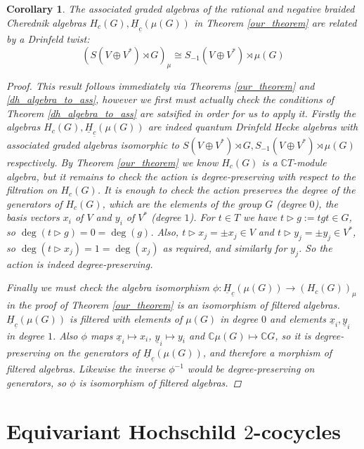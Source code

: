 \documentclass[10pt]{article}
\newcommand{\bb}{\medbreak}
\newcommand{\nt}{\noindent}
\newcommand{\Cc }{\mathbb{C}}
\newcommand{\rt}{\xrightarrow{}}
\newtheorem{cor}[lemma]{Corollary}
\theoremstyle{definition}
\begin{document}
\begin{cor} The associated graded algebras of the rational and negative braided Cherednik algebras $H_c(G),\underline{H}_{\underline{c}}(\mu(G))$ in Theorem \ref{our_theorem} are related by a Drinfeld twist:
\begin{equation}\label{twist_ass}(S(V\oplus V^*)\rtimes G)_\mu\cong S_{-1}(V\oplus V^*)\rtimes \mu(G)\end{equation}
\begin{proof}
This result follows immediately via Theorems \ref{our_theorem} and \ref{dh_algebra_to_ass}, however we first must actually check the conditions of Theorem  \ref{dh_algebra_to_ass} are satsified in order for us to apply it. Firstly the algebras $H_c(G),\underline{H}_{\underline{c}}(\mu(G))$ are indeed quantum Drinfeld Hecke algebras with associated graded algebras isomorphic to $S(V\oplus V^*)\rtimes G, S_{-1}(V\oplus V^*)\rtimes \mu(G)$ respectively. By Theorem \ref{our_theorem} we know $H_c(G)$ is a $\Cc  T$-module algebra, but it remains to check the action is degree-preserving with respect to the filtration on $H_c(G)$. It is enough to check the action preserves the degree of the generators of $H_c(G)$, which are the elements of the group $G$ (degree $0$), the basis vectors $x_i$ of $V$ and $y_i$ of $V^*$ (degree $1$). For $t\in T$ we have $t\rhd g:=tgt\in G$, so $\deg(t\rhd g)=0=\deg(g)$. Also, $t\rhd x_j=\pm x_j\in V$ and $t\rhd y_j=\pm y_j\in V^*$, so $\deg(t\rhd x_j)=1=\deg(x_j)$ as required, and similarly for $y_j$. So the action is indeed degree-preserving.\bb

\nt Finally we must check the algebra isomorphism $\phi: \underline{H}_{\underline{c}}(\mu(G))\rt (H_c(G))_\mu$ in the proof of Theorem \ref{our_theorem} is an isomorphism of filtered algebras. $\underline{H}_{\underline{c}}(\mu(G))$ is filtered with elements of $\mu(G)$ in degree $0$ and elements $\underline{x}_i,\underline{y}_i$ in degree $1$. Also $\phi$ maps $\underline{x}_i\mapsto x_i$, $\underline{y}_i\mapsto y_i$ and $\Cc  \mu(G)\mapsto \Cc  G$, so it is degree-preserving on the generators of $\underline{H}_{\underline{c}}(\mu(G))$, and therefore a morphism of filtered algebras. Likewise the inverse $\phi^{-1}$ would be degree-preserving on generators, so $\phi$ is isomorphism of filtered algebras.
\end{proof}
\end{cor}


\section{Equivariant Hochschild \texorpdfstring{$2$}{2}-cocycles}\label{claim_2_sec}
\end{document}
